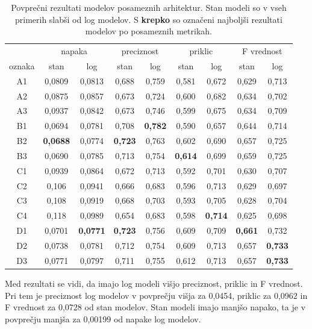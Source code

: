 \documentclass[a4paper, 12pt, openright]{book}
\begin{document}
\begin{table}[]
    \centering
    \begin{tabular}{c|cc|cc|cc|cc}
         & \multicolumn{2}{c|}{napaka} & \multicolumn{2}{c|}{preciznost} & \multicolumn{2}{c|}{priklic} & \multicolumn{2}{c}{F vrednost} \\
        oznaka & stan & log & stan & log & stan & log & stan & log \\
        \hline
        A1 & 0,0809 & 0,0813 & 0,688 & 0,759 & 0,581 & 0,672 & 0,629 & 0,713 \\
        A2 & 0,0875 & 0,0857 & 0,673 & 0,724 & 0,600 & 0,682 & 0,634 & 0,702 \\
        A3 & 0,0937 & 0,0842 & 0,673 & 0,746 & 0,599 & 0,675 & 0,634 & 0,709 \\
        \hline
        B1 & 0,0694 & 0,0781 & 0,708 & \textbf{0,782} & 0,590 & 0,657 & 0,644 & 0,714 \\
        B2 & \textbf{0,0688} & 0,0774 & \textbf{0,723} & 0,763 & 0,602 & 0,690 & 0,657 & 0,725 \\
        B3 & 0,0690 & 0,0785 & 0,713 & 0,754 & \textbf{0,614} & 0,699 & 0,659 & 0,725 \\
        \hline
        C1 & 0,0939 & 0,0864 & 0,672 & 0,713 & 0,592 & 0,701 & 0,630 & 0,707 \\
        C2 & 0,106 & 0,0941 & 0,666 & 0,683 & 0,596 & 0,713 & 0,629 & 0,697 \\
        C3 & 0,108 & 0,0919 & 0,668 & 0,703 & 0,593 & 0,705 & 0,628 & 0,704 \\
        C4 & 0,118 & 0,0989 & 0,654 & 0,683 & 0,598 & \textbf{0,714} & 0,625 & 0,698 \\
        \hline
        D1 & 0,0701 & \textbf{0,0771} & \textbf{0,723} & 0,756 & 0,609 & 0,709 & \textbf{0,661} & 0,732 \\
        D2 & 0,0738 & 0,0781 & 0,712 & 0,754 & 0,609 & 0,713 & 0,657 & \textbf{0,733} \\
        D3 & 0,0771 & 0,0797 & 0,711 & 0,755 & 0,612 & 0,713 & 0,657 & \textbf{0,733} \\
    \end{tabular}
    \caption{Povprečni rezultati modelov posameznih arhitektur. Stan modeli so v vseh primerih slabši od log modelov. S \textbf{krepko} so označeni najboljši rezultati modelov po posameznih metrikah.}
    \label{tab:results}
\end{table}

Med rezultati se vidi, da imajo log modeli višjo preciznost, priklic in F vrednost.
Pri tem je preciznost log modelov v povprečju višja za 0,0454, priklic za 0,0962 in F vrednost za 0,0728 od stan modelov.
Stan modeli imajo manjšo napako, ta je v povprečju manjša za 0,00199 od napake log modelov.
\end{document}
